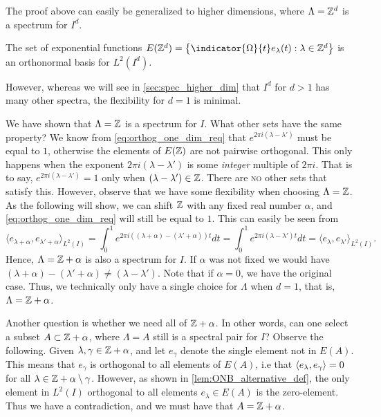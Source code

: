 \documentclass[../thesis.tex]{subfiles}
\begin{document}
The proof above can easily be generalized to higher dimensions, where $\Lambda = \mathbb{Z}^d$ is a spectrum for $I^d$.
\begin{lemma}
    The set of exponential functions $E(\Z^d) = \braqMed{\indicator{\Omega}{t} e_\lambda(t) : \lambda \in \Z^d}$ is an orthonormal basis for $L^2(I^d)$.
\end{lemma}

However, whereas we will see in \cref{sec:spec_higher_dim} that $I^d$ for $d>1$ has many other spectra, the flexibility for $d=1$ is minimal. 

We have shown that $\Lambda = \mathbb{Z}$ is a spectrum for $I$. What other sets have the same property? We know from \cref{eq:orthog_one_dim_req} that $e^{2\pi i(\lambda-\lambda')}$ must be equal to $1$, otherwise the elements of $E(\mathbb{Z})$ are not pairwise orthogonal. This only happens when the exponent  $2\pi i (\lambda - \lambda')$ is some \emph{integer} multiple of $2 \pi i$. That is to say, $e^{2\pi i(\lambda-\lambda')} = 1$ only when $(\lambda-\lambda') \in \mathbb{Z}$. There are \textsc{no} other sets that satisfy this. However, observe that we have some flexibility when choosing $\Lambda = \mathbb{Z}$. As the following will show, we can shift $\mathbb{Z}$ with any fixed real number $\alpha$, and \cref{eq:orthog_one_dim_req} will still be equal to $1$. This can easily be seen from 
\begin{equation}
    \langle e_{\lambda+\alpha},e_{\lambda'+\alpha} \rangle_{L^2(I)} = \int_0^1 e^{2 \pi i ((\lambda+\alpha) - (\lambda'+\alpha))t} dt = \int_0^1 e^{2 \pi i (\lambda-\lambda')t} dt = \langle e_{\lambda},e_{\lambda'} \rangle_{L^2(I)}.
\end{equation}
Hence, $\Lambda = \mathbb{Z} + \alpha$ is also a spectrum for $I$. If $\alpha$ was not fixed we would have $(\lambda+\alpha) - (\lambda'+\alpha) \neq (\lambda - \lambda')$. Note that if $\alpha=0$, we have the original case. Thus, we technically only have a single choice for $\Lambda$ when $d=1$, that is, $\Lambda = \mathbb{Z}+ \alpha$. 

Another question is whether we need all of $\mathbb{Z} +\alpha$. In other words, can one select a subset $A\subset \mathbb{Z} + \alpha$, where $\Lambda = A$ still is a spectral pair for $I$? Observe the following. Given $\lambda, \gamma \in \mathbb{Z}+\alpha$, and let $e_{\gamma}$ denote the single element not in $E(A)$. This means that $e_\gamma$ is orthogonal to all elements of $E(A)$, i.e that $\langle e_{\lambda}, e_{\gamma}\rangle = 0$ for all $\lambda \in \mathbb{Z} +\alpha\setminus \gamma$. However, as shown in \cref{lem:ONB_alternative_def}, the only element in $L^2(I)$ orthogonal to all elements $e_{\lambda} \in E(A)$ is the zero-element. Thus we have a contradiction, and we must have that $A = \mathbb{Z}+\alpha$.
\end{document}
